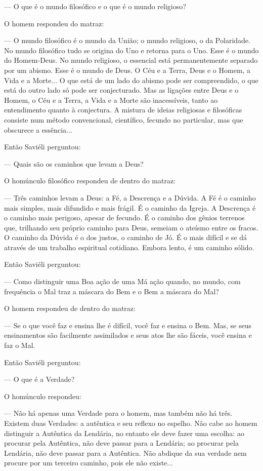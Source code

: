 --- O que é o mundo filosófico e o que é o mundo religioso?

O homem respondeu do matraz:

--- O mundo filosófico é o mundo da União; o mundo religioso, o da
Polaridade. No mundo filosófico tudo se origina do Uno e retorna para o
Uno. Esse é o mundo do Homem-Deus. No mundo religioso, o essencial está
permanentemente separado por um abismo. Esse é o mundo de Deus. O Céu e
a Terra, Deus e o Homem, a Vida e a Morte... O que está de um lado do
abismo pode ser compreendido, o que está do outro lado só pode ser
conjecturado. Mas as ligações entre Deus e o Homem, o Céu e a Terra, a
Vida e a Morte são inacessíveis, tanto ao entendimento quanto à
conjectura. A mistura de ideias religiosas e filosóficas consiste num
método convencional, científico, fecundo no particular, mas que
obscurece a essência...

Então Saviéli perguntou:

--- Quais são os caminhos que levam a Deus?

O homúnculo filosófico respondeu de dentro do matraz:

--- Três caminhos levam a Deus: a Fé, a Descrença e a Dúvida. A Fé é o
caminho mais simples, mais difundido e mais frágil. É o caminho da
Igreja. A Descrença é o caminho mais perigoso, apesar de fecundo. É o
caminho dos gênios terrenos que, trilhando seu próprio caminho para
Deus, semeiam o ateísmo entre os fracos. O caminho da Dúvida é o dos
justos, o caminho de Jó. É o mais difícil e se dá através de um trabalho
espiritual cotidiano. Embora lento, é um caminho sólido.

Então Saviéli perguntou:

--- Como distinguir uma Boa ação de uma Má ação quando, no mundo, com
frequência o Mal traz a máscara do Bem e o Bem a máscara do Mal?

O homem respondeu de dentro do matraz:

--- Se o que você faz e ensina lhe é difícil, você faz e ensina o Bem.
Mas, se seus ensinamentos são facilmente assimilados e seus atos lhe são
fáceis, você ensina e faz o Mal.

Então Saviéli perguntou:

--- O que é a Verdade?

O homúnculo respondeu:

--- Não há apenas uma Verdade para o homem, mas também não há três.
Existem duas Verdades: a autêntica e seu reflexo no espelho. Não cabe ao
homem distinguir a Autêntica da Lendária, no entanto ele deve fazer uma
escolha: ao procurar pela Autêntica, não deve passar para a Lendária; ao
procurar pela Lendária, não deve passar para a Autêntica. Não abdique da
sua verdade nem procure por um terceiro caminho, pois ele não existe...

